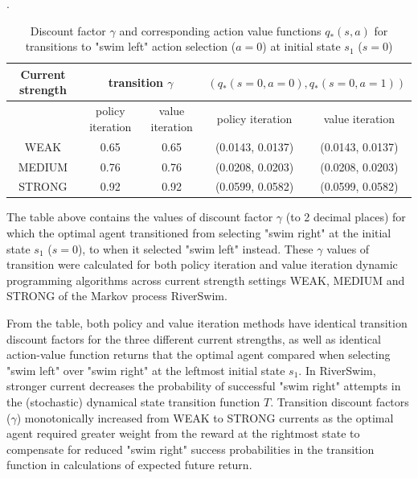 \begin{answer}
  \begin{table}[h!]
  	\begin{center}
 	    \caption{Discount factor $\gamma$ and corresponding action value functions $q_{\ast}(s, a)$ for transitions to "swim left" action selection ($a = 0$) at initial state $s_{1}$ ($s = 0$)}.
    	\begin{tabular}{c|c|c|c|c}
        	\textbf{Current strength} & \multicolumn{2}{|c}{\textbf{transition $\gamma$}}  		& \multicolumn{2}{|c}{\textbf{$(q_{\ast}(s=0, a=0), q_{\ast}(s=0, a=1))$}} 			\\
          \hline
               					& policy iteration        	& value iteration 	& policy iteration                         	& value iteration  	\\
    		  \hline
        	WEAK   	          & 0.65                		& 0.65        		& (0.0143, 0.0137)                       		& (0.0143, 0.0137) 	\\
        	MEDIUM           	& 0.76                		& 0.76        		& (0.0208, 0.0203)                       		& (0.0208, 0.0203) 	\\
        	STRONG           	& 0.92                		& 0.92        		& (0.0599, 0.0582)                       		& (0.0599, 0.0582) 	\\
   	\end{tabular}
   	\end{center}
  \end{table}
  
  The table above contains the values of discount factor $\gamma$ (to 2 decimal places) for which the optimal agent transitioned from selecting "swim right" at 
  the initial state $s_{1}$ ($s = 0$), to when it selected "swim left" instead. These $\gamma$ values of transition were calculated for both policy 
  iteration and value iteration dynamic programming algorithms across current strength settings WEAK, MEDIUM and STRONG of the Markov 
  process RiverSwim.

  From the table, both policy and value iteration methods have identical transition discount factors for the three different 
  current strengths, as well as identical action-value function returns that the optimal agent compared when selecting "swim left" over "swim right" at the leftmost 
  initial state $s_{1}$. In RiverSwim, stronger current decreases the probability of successful "swim right" attempts in the
  (stochastic) dynamical state transition function $T$. Transition discount factors ($\gamma$) monotonically increased from WEAK to STRONG currents 
  as the optimal agent required greater weight from the reward at the rightmost state to compensate for reduced "swim right" success probabilities in the transition 
  function in calculations of expected future return.
\end{answer}
\clearpage


